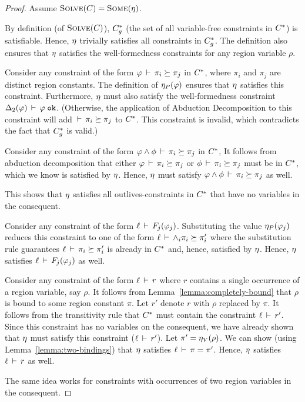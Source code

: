 \begin{proof}
Assume $\textsc{Solve}(C) = \textsc{Some}(\eta)$.

By definition (of $\textsc{Solve}(C)$), ${C}^*_g$ (the set of all variable-free constraints in ${C}^*$)
is satisfiable. Hence, $\eta$ trivially satisfies all constraints in ${C}^*_g$.
%
The definition also ensures that $\eta$ satisfies the well-formedness constraints
for any region variable $\rho$.

Consider any constraint of the form $\varphi\,\vdash\,\pi_i \succeq \pi_j$ in ${C}^*$,
where $\pi_i$ and $\pi_j$ are distinct region constants. The definition of $\eta_P(\varphi)$
ensures that $\eta$ satisfies this constraint.
Furthermore, $\eta$ must also satisfy the well-formedness constraint
${\Delta_2}(\varphi)\,\vdash\,\varphi \; \texttt{ok}$.
(Otherwise, the application of Abduction Decomposition to this constraint will add
$\,\vdash\,\pi_i \succeq \pi_j$ to ${C}^*$. This constraint is invalid, which
contradicts the fact that ${C}^*_g$ is valid.)

Consider any constraint of the form $\varphi \wedge \phi\,\vdash\,\pi_i \succeq \pi_j$ in ${C}^*$,
It follows from abduction decomposition that either
$\varphi\,\vdash\,\pi_i \succeq \pi_j$
or
$\phi\,\vdash\,\pi_i \succeq \pi_j$ must be in ${C}^*$, which we know is satisfied by $\eta$.
Hence, $\eta$ must satisfy
$\varphi \wedge \phi\,\vdash\,\pi_i \succeq \pi_j$ as well.

This shows that $\eta$ satisfies all outlives-constraints in ${C}^*$ that have no variables in the consequent.

Consider any constraint of the form $\ell\,\vdash\,F_j(\varphi_j)$.
Substituting the value $\eta_P(\varphi_j)$ reduces this constraint to one of
the form $\ell\,\vdash\,\wedge_i \pi_i \succeq \pi_i'$ where the substitution rule
guarantees $\ell\,\vdash\,\pi_i \succeq \pi_i'$ is already in ${C}^*$ and, hence,
satisfied by $\eta$.
Hence, $\eta$ satisfies $\ell\,\vdash\,F_j(\varphi_j)$ as well.

Consider any constraint of the form $\ell\,\vdash\,r$ where $r$ contains a single occurrence
of a region variable, say $\rho$.
It follows from Lemma~\ref{lemma:completely-bound} that $\rho$ is bound to some region
constant $\pi$.
Let $r'$ denote $r$ with $\rho$ replaced by $\pi$.
It follows from the transitivity rule that ${C}^*$ must contain the constraint $\ell\,\vdash\,r'$.
Since this constraint has no variables on the consequent, we have already shown that $\eta$
must satisfy this constraint ($\ell\,\vdash\,r'$).
Let $\pi' = \eta_V(\rho)$.
We can show (using Lemma~\ref{lemma:two-bindings}) that $\eta$ satisfies $\ell\,\vdash\,\pi = \pi'$.
Hence, $\eta$ satisfies $\ell\,\vdash\,r$ as well.

The same idea works for constraints with occurrences of two region variables in the consequent.

\end{proof}

